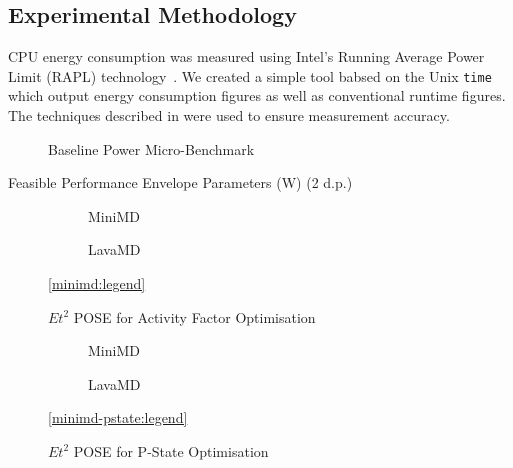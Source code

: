 \subsection{Experimental Methodology}
CPU energy consumption was measured using Intel's Running Average Power Limit (RAPL) technology~\cite{david:2010aa}.
We created a simple tool babsed on the Unix \texttt{time} which output energy consumption figures as well as conventional runtime figures.
The techniques described in \cite{hackenberg:2013aa} were used to ensure measurement accuracy. 


\begin{figure}[ht]                                                               
\centering                                                                      
\lstset{basicstyle=\ttfamily\footnotesize\bfseries, frame=tb} %
              
\caption{Baseline Power Micro-Benchmark}                            
\label{fig:microbench}                                                           
\end{figure}  


\begin{table}
\centering
\caption{Feasible Performance Envelope Parameters (W) (2 d.p.)}

\end{table} 

\begin{figure}[t]%
  \begin{subfigure}[t]{.5\linewidth}%
    \caption{MiniMD}%
  \end{subfigure}%
  \begin{subfigure}[t]{.5\linewidth}%
    \caption{LavaMD}%
  \end{subfigure}%
  \begin{center}%
    \ref{minimd:legend}%
  \end{center}%
  \caption{$Et^2$ POSE for Activity Factor Optimisation}%
  \label{fig:minimd}%
\end{figure}

\begin{figure}[t]%
\begin{subfigure}[t]{.5\linewidth}%
\centering%
%
\caption{MiniMD}%
\end{subfigure}%
\begin{subfigure}[t]{.5\linewidth}%
%
\caption{LavaMD}%
\end{subfigure}%
\begin{center}%
\ref{minimd-pstate:legend}%
\end{center}%
\caption{$Et^2$ POSE for P-State Optimisation}%
\label{fig:pstates}%
\end{figure}%


